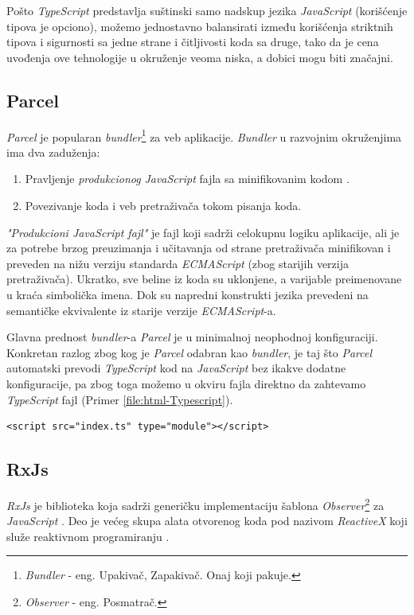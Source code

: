 \documentclass[12pt,oneside]{memoir}
\newcommand{\code}[1]{\colorbox{codegray}{\texttt{\scalebox{0.9}{#1}}}}%
\begin{document}
Pošto \emph{TypeScript} predstavlja suštinski samo nadskup jezika \emph{JavaScript} (korišćenje tipova je opciono),
možemo jednostavno balansirati između korišćenja striktnih tipova i sigurnosti sa jedne strane i čitljivosti koda sa druge,
tako da je cena uvođenja ove tehnologije u okruženje veoma niska, a dobici mogu biti značajni.
\subsection{Parcel}
\emph{Parcel} je popularan \emph{bundler}\footnote{\emph{Bundler} - eng. Upakivač, Zapakivač. Onaj koji pakuje.} za veb aplikacije.
\emph{Bundler} u razvojnim okruženjima ima dva zaduženja:
\begin{enumerate}
  \item Pravljenje \emph{produkcionog} \emph{JavaScript} fajla sa minifikovanim kodom \cite{Minification}.
  \item Povezivanje koda i veb pretraživača tokom pisanja koda.
\end{enumerate} 
\emph{"Produkcioni JavaScript fajl"} je fajl koji sadrži celokupnu logiku aplikacije, ali je za potrebe brzog preuzimanja i
učitavanja od strane pretraživača minifikovan i preveden na nižu verziju standarda \emph{ECMAScript} \cite{ECMAScript}(zbog starijih verzija pretraživača).
Ukratko, sve beline iz koda su uklonjene, a varijable preimenovane u kraća simbolička imena. Dok su napredni konstrukti jezika
prevedeni na semantičke ekvivalente iz starije verzije \emph{ECMAScript}-a.

Glavna prednost \emph{bundler}-a \emph{Parcel} je u minimalnoj neophodnoj konfiguraciji.
Konkretan razlog zbog kog je \emph{Parcel} odabran kao \emph{bundler}, je taj što \emph{Parcel} automatski
prevodi \emph{TypeScript} kod na \emph{JavaScript} bez ikakve dodatne konfiguracije, pa zbog toga možemo u okviru
fajla \code{index.html} direktno da zahtevamo \emph{TypeScript} fajl (Primer \ref{file:html-Typescript}).
\begin{lstlisting}[style=htmlStyle,numberstyle=\tiny, caption={Uključivanje \emph{TypeScript} fajla direktno u \code{index.html}}, label=file:html-Typescript]
<script src="index.ts" type="module"></script>
\end{lstlisting}

\subsection{RxJs}
\emph{RxJs} je biblioteka koja sadrži generičku implementaciju šablona \emph{Observer}\footnote{\emph{Observer} - eng. Posmatrač.} za \emph{JavaScript} \cite{GoF} \cite{RxJs}.
Deo je većeg skupa alata otvorenog koda pod nazivom \emph{ReactiveX} koji služe reaktivnom programiranju \cite{ReactiveX}.
\end{document}

